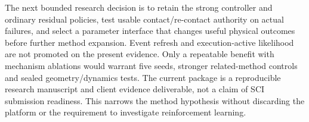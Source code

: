 The next bounded research decision is to retain the strong controller and ordinary residual policies, test usable contact/re-contact authority on actual failures, and select a parameter interface that changes useful physical outcomes before further method expansion. Event refresh and execution-active likelihood are not promoted on the present evidence. Only a repeatable benefit with mechanism ablations would warrant five seeds, stronger related-method controls and sealed geometry/dynamics tests. The current package is a reproducible research manuscript and client evidence deliverable, not a claim of SCI submission readiness. This narrows the method hypothesis without discarding the platform or the requirement to investigate reinforcement learning.
